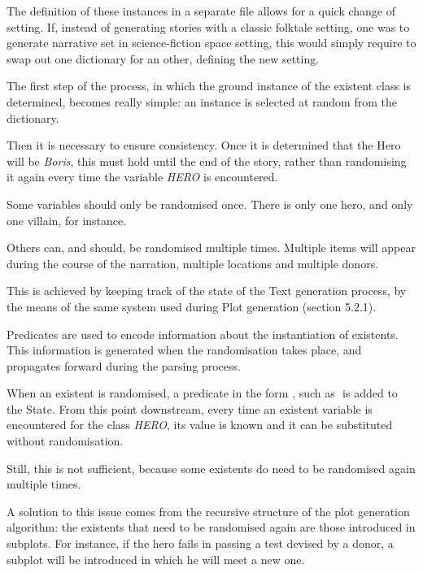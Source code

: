 \documentclass[12pt,a4paper,oneside]{report}
\begin{document}
\bigskip

The definition of these instances in a separate file allows for a quick change of setting. If, instead of generating stories with a classic folktale setting, one was to generate narrative set in science-fiction space setting, this would simply require to swap out one dictionary for an other, defining the new setting.

\bigskip

The first step of the process, in which the ground instance of the existent class is determined, becomes really simple: an instance is selected at random from the dictionary.

\bigskip

Then it is necessary to ensure consistency. Once it is determined that the Hero will be \textit{Boris}, this must hold until the end of the story, rather than randomising it again every time the variable \textit{HERO} is encountered.

Some variables should only be randomised once. There is only one hero, and only one villain, for instance.

Others can, and should, be randomised multiple times. Multiple items will appear during the course of the narration, multiple locations and multiple donors.

\bigskip

This is achieved by keeping track of the state of the Text generation process, by the means of the same system used during Plot generation (section 5.2.1).

Predicates are used to encode information about the instantiation of existents. This information is generated when the randomisation takes place, and propagates forward during the parsing process.

When an existent is randomised, a predicate in the form \(<Class,Instance>\), such as \(<HERO,Boris>\) is added to the State. From this point downstream, every time an existent variable is encountered for the class \textit{HERO}, its value is known and it can be substituted without randomisation.

\bigskip

Still, this is not sufficient, because some existents do need to be randomised again multiple times.

\bigskip

A solution to this issue comes from the recursive structure of the plot generation algorithm: the existents that need to be randomised again are those introduced in subplots. For instance, if the hero fails in passing a test devised by a donor, a subplot will be introduced in which he will meet a new one.
\end{document}
